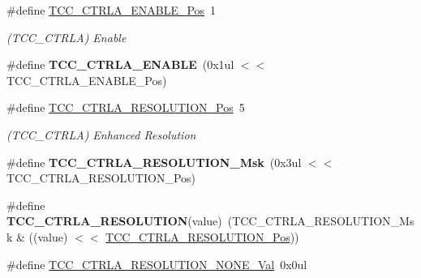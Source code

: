 \begin{DoxyCompactItemize}
\item 
\hypertarget{group___s_a_m_l21___t_c_c_ga6884772d218a609d7ea027c9cab33b9f}{}\#define \hyperlink{group___s_a_m_l21___t_c_c_ga6884772d218a609d7ea027c9cab33b9f}{T\+C\+C\+\_\+\+C\+T\+R\+L\+A\+\_\+\+E\+N\+A\+B\+L\+E\+\_\+\+Pos}~1\label{group___s_a_m_l21___t_c_c_ga6884772d218a609d7ea027c9cab33b9f}

\begin{DoxyCompactList}\small\item\em (T\+C\+C\+\_\+\+C\+T\+R\+L\+A) Enable \end{DoxyCompactList}\item 
\hypertarget{group___s_a_m_l21___t_c_c_ga5ec1169d59451108959eae5757bde4ca}{}\#define {\bfseries T\+C\+C\+\_\+\+C\+T\+R\+L\+A\+\_\+\+E\+N\+A\+B\+L\+E}~(0x1ul $<$$<$ T\+C\+C\+\_\+\+C\+T\+R\+L\+A\+\_\+\+E\+N\+A\+B\+L\+E\+\_\+\+Pos)\label{group___s_a_m_l21___t_c_c_ga5ec1169d59451108959eae5757bde4ca}

\item 
\hypertarget{group___s_a_m_l21___t_c_c_gaae5fd9846d9468fd2d0bbf8748e2a39b}{}\#define \hyperlink{group___s_a_m_l21___t_c_c_gaae5fd9846d9468fd2d0bbf8748e2a39b}{T\+C\+C\+\_\+\+C\+T\+R\+L\+A\+\_\+\+R\+E\+S\+O\+L\+U\+T\+I\+O\+N\+\_\+\+Pos}~5\label{group___s_a_m_l21___t_c_c_gaae5fd9846d9468fd2d0bbf8748e2a39b}

\begin{DoxyCompactList}\small\item\em (T\+C\+C\+\_\+\+C\+T\+R\+L\+A) Enhanced Resolution \end{DoxyCompactList}\item 
\hypertarget{group___s_a_m_l21___t_c_c_ga483d4ffbaafba55adc6c12dc6d0b0582}{}\#define {\bfseries T\+C\+C\+\_\+\+C\+T\+R\+L\+A\+\_\+\+R\+E\+S\+O\+L\+U\+T\+I\+O\+N\+\_\+\+Msk}~(0x3ul $<$$<$ T\+C\+C\+\_\+\+C\+T\+R\+L\+A\+\_\+\+R\+E\+S\+O\+L\+U\+T\+I\+O\+N\+\_\+\+Pos)\label{group___s_a_m_l21___t_c_c_ga483d4ffbaafba55adc6c12dc6d0b0582}

\item 
\hypertarget{group___s_a_m_l21___t_c_c_gabc206db3b2757143bb53dae5f607438c}{}\#define {\bfseries T\+C\+C\+\_\+\+C\+T\+R\+L\+A\+\_\+\+R\+E\+S\+O\+L\+U\+T\+I\+O\+N}(value)~(T\+C\+C\+\_\+\+C\+T\+R\+L\+A\+\_\+\+R\+E\+S\+O\+L\+U\+T\+I\+O\+N\+\_\+\+Msk \& ((value) $<$$<$ \hyperlink{group___s_a_m_l21___t_c_c_gaae5fd9846d9468fd2d0bbf8748e2a39b}{T\+C\+C\+\_\+\+C\+T\+R\+L\+A\+\_\+\+R\+E\+S\+O\+L\+U\+T\+I\+O\+N\+\_\+\+Pos}))\label{group___s_a_m_l21___t_c_c_gabc206db3b2757143bb53dae5f607438c}

\item 
\hypertarget{group___s_a_m_l21___t_c_c_gab80a187329f0ba797f179c605e3c109a}{}\#define \hyperlink{group___s_a_m_l21___t_c_c_gab80a187329f0ba797f179c605e3c109a}{T\+C\+C\+\_\+\+C\+T\+R\+L\+A\+\_\+\+R\+E\+S\+O\+L\+U\+T\+I\+O\+N\+\_\+\+N\+O\+N\+E\+\_\+\+Val}~0x0ul\label{group___s_a_m_l21___t_c_c_gab80a187329f0ba797f179c605e3c109a}


\end{DoxyCompactItemize}
